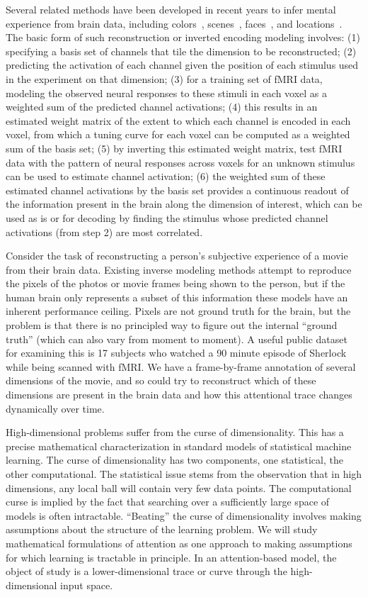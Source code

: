Several related methods have been developed in recent years to infer mental experience from brain data, including colors~\citep{Brouwer:2009}, scenes~\citep{Naselaris:2009}, faces~\citep{Cowen:2014}, and locations~\citep{Sprague:2016}. The basic form of such reconstruction or inverted encoding modeling involves: (1) specifying a basis set of channels that tile the dimension to be reconstructed; (2) predicting the activation of each channel given the position of each stimulus used in the experiment on that dimension; (3) for a training set of fMRI data, modeling the observed neural responses to these stimuli in each voxel as a weighted sum of the predicted channel activations; (4) this results in an estimated weight matrix of the extent to which each channel is encoded in each voxel, from which a tuning curve for each voxel can be computed as a weighted sum of the basis set; (5) by inverting this estimated weight matrix, test fMRI data with the pattern of neural responses across voxels for an unknown stimulus can be used to estimate channel activation; (6) the weighted sum of these estimated channel activations by the basis set provides a continuous readout of the information present in the brain along the dimension of interest, which can be used as is or for decoding by finding the stimulus whose predicted channel activations (from step 2) are most correlated.

Consider the task of reconstructing a person's
subjective experience of a movie from their brain data. Existing
inverse modeling methods attempt to reproduce the pixels of the photos
or movie frames being shown to the person, but if the human brain only
represents a subset of this information these models have an inherent
performance ceiling. Pixels are not ground truth for the brain, but
the problem is that there is no principled way to figure out the
internal ``ground truth''  (which can also vary from moment to moment). A useful public dataset for examining this is 17 subjects who watched a 90 minute episode of Sherlock while being scanned with fMRI. We have a frame-by-frame annotation of several dimensions of the movie, and so could try to reconstruct which of these dimensions are present in the brain data and how this attentional trace changes dynamically over time.

\statbackground{} High-dimensional problems suffer from the curse of
dimensionality. This has a precise mathematical characterization in
standard models of statistical machine learning. The curse of
dimensionality has two components, one statistical, the other
computational. The statistical issue stems from the observation that
in high dimensions, any local ball will contain very few data
points. The computational curse is implied by the fact that searching
over a sufficiently large space of models is often
intractable. ``Beating'' the curse of dimensionality involves making
assumptions about the structure of the learning problem. We will study
mathematical formulations of attention as one approach to making
assumptions for which learning is tractable in principle.
In an attention-based model, the object of study is a
lower-dimensional trace or curve through the high-dimensional input
space. 

